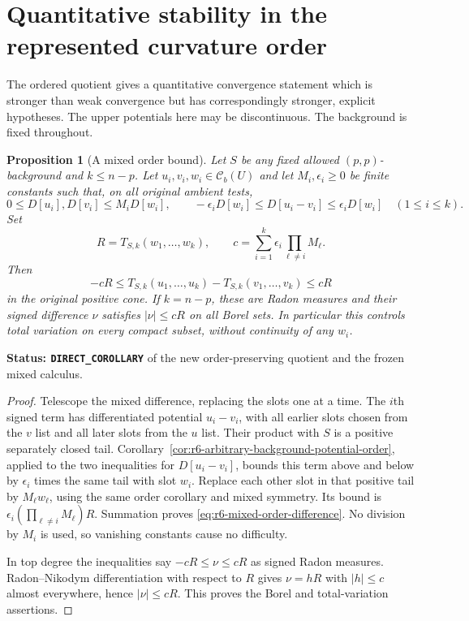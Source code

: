 \documentclass[11pt,a4paper]{article}
\numberwithin{equation}{section}
\newtheorem{proposition}[theorem]{Proposition}
\theoremstyle{definition}
\theoremstyle{remark}
\begin{document}


\section{Quantitative stability in the represented curvature order}
\label{sec:r6-represented-order-stability}

The ordered quotient gives a quantitative convergence statement which
is stronger than weak convergence but has correspondingly stronger,
explicit hypotheses. The upper potentials here may be discontinuous.
The background is fixed throughout.

\begin{proposition}[A mixed order bound]
\label{prop:r6-mixed-represented-order-bound}
Let $S$ be any fixed allowed $(p,p)$-background and $k\le n-p$.
Let $u_i,v_i,w_i\in\mathcal C_b(U)$ and let $M_i,\epsilon_i\ge0$
be finite constants such that, on all original ambient tests,
\[
 0\le D[u_i],D[v_i]\le M_iD[w_i],\qquad
 -\epsilon_iD[w_i]\le D[u_i-v_i]\le\epsilon_iD[w_i]
                    \quad(1\le i\le k).
\]
Set
\[
 R=T_{S,k}(w_1,\ldots,w_k),\qquad
 c=\sum_{i=1}^k\epsilon_i\prod_{\ell\ne i}M_\ell.
\]
Then
\begin{equation}
 -cR\le T_{S,k}(u_1,\ldots,u_k)-T_{S,k}(v_1,\ldots,v_k)
                                      \le cR
 \label{eq:r6-mixed-order-difference}
\end{equation}
in the original positive cone. If $k=n-p$, these are Radon measures
and their signed difference $\nu$ satisfies $|\nu|\le cR$ on all
Borel sets. In particular this controls total variation on every
compact subset, without continuity of any $w_i$.
\end{proposition}

\noindent\textbf{Status: \texttt{DIRECT\_COROLLARY}} of the
new order-preserving quotient and the frozen mixed calculus.

\begin{proof}
Telescope the mixed difference, replacing the slots one at a time.
The $i$th signed term has differentiated potential $u_i-v_i$, with
all earlier slots chosen from the $v$ list and all later slots from
the $u$ list. Their product with $S$ is a positive separately closed
tail. Corollary~\ref{cor:r6-arbitrary-background-potential-order},
applied to the two inequalities for $D[u_i-v_i]$, bounds this term
above and below by $\epsilon_i$ times the same tail with slot $w_i$.
Replace each other slot in that positive tail by $M_\ell w_\ell$,
using the same order corollary and mixed symmetry. Its bound is
$\epsilon_i(\prod_{\ell\ne i}M_\ell)R$. Summation proves
\eqref{eq:r6-mixed-order-difference}. No division by $M_i$ is used,
so vanishing constants cause no difficulty.

In top degree the inequalities say $-cR\le\nu\le cR$ as signed
Radon measures. Radon--Nikodym differentiation with respect to $R$
gives $\nu=hR$ with $|h|\le c$ almost everywhere, hence
$|\nu|\le cR$. This proves the Borel and total-variation assertions.
\end{proof}
\end{document}
